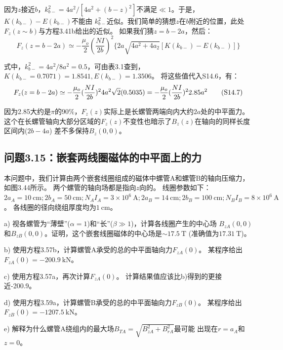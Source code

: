 因为$z$接近$b$，$k_{b−}^2 = 4a^2/[4a^2+(b−z)^2]$不满足$\ll 1$。于是，$K(k_{b−})−E(k_{b−})$不能由
$k_{b-}^2$近似。我们简单的猜想$z$在$b$附近的位置，此处$F_z(z\sim b)$与方程3.41b给出的近似。
如果我们猜$z=b-2a$，然后：
\begin{equation*}
F_{z}(z=b-2a)\simeq-\frac{\mu_{o}}{2}(\frac{NI}{2b})^{2}\{2a\sqrt{4a^{2}+4a_{2}}[K(k_{b-})-E(k_{b-})]\}\tag{S14.6}%
\end{equation*}

式中，$k^2_{b-}=4a^2/8a^2 =0.5$，可由表3.1查到，$K(k_{b−} =0.7071)=1.8541,E(k_{b−})=1.3506$。
将这些值代入S14.6，有：
\begin{equation*}
F_{z}(z=b-2a)\simeq-\frac{\mu_{o}}{2}(\frac{NI}{2b})^{2}4a^{2}\sqrt{2}(0.5035)\\
=-\frac{\mu_{o}}{2}(\frac{NI}{2b})^{2}2.85a^{2}\tag{S14.7}%
\end{equation*}

因为2.85大约是$\pi$的90\%，$F_z(z)$实际上是长螺管两端向内大约$2a$处的中平面力。
这个在长螺管轴向大部分区域的$F_z(z)$不变性也暗示了$B_z(z)$在轴向的同样长度区间内($2b-4a$)
差不多保持$B_z(0,0)$。



\subsection{问题3.15：嵌套两线圈磁体的中平面上的力}
本问题中，我们计算由两个嵌套线圈组成的磁体中螺管A和螺管B的轴向压缩力，如图3.44所示。
两个螺管的轴向场都是指向$z$向的。
线圈参数如下：$2a_A=10\ \mathrm{cm};2b_A = 50\ \mathrm{cm}; N_A I_A = 3\times 10^6\ \mathrm{A};
2a_B = 14\ \mathrm{cm}; 2b_B = 100\ \mathrm{cm}; N_B I_B = 8\times10^6\ \mathrm{A}$。
各线圈的径向绕组厚度均为$1\ \mathrm{cm}$。

a) 视各螺管为“薄壁”($\alpha = 1$)和“长”($\beta\gg 1$)，计算各线圈产生的中心场
$B_{zA}(0, 0)$和$B_{zB}(0, 0)$。证明，这个嵌套线圈磁体的中心场是$\sim 17.5\ \mathrm{T}$
(准确值为$17.31\ \mathrm{T}$)。

b) 使用方程3.57b，计算螺管A承受的总的中平面轴向力$F_{zA}(0)$。
某程序给出$F_{zA}(0)=-200.9\ \mathrm{kN}$。

c) 使用方程3.57a，再次计算$F_{zA}(0)$。
计算结果值应该比b)得到的更接近-200.9。

d) 使用方程3.59a，计算螺管B承受的总的中平面轴向力$F_{zB}(0)$。
某程序给出$F_{zB}(0)=-1207.5\ \mathrm{kN}$。

e) 解释为什么螺管A绕组内的最大场$B_{TA}=\sqrt{B_{zA}^2 + B_{rA}^2}$最可能
	出现在$r=a_A$和$z=0$。
	
